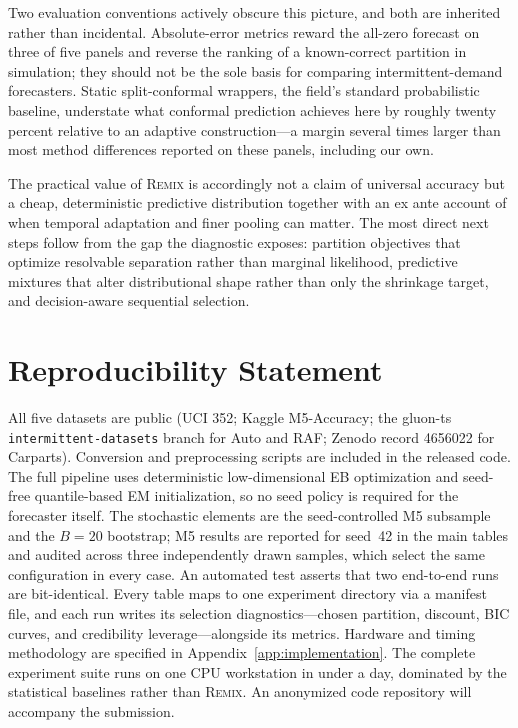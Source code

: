 \documentclass[twocolumn,10pt]{article}
\theoremstyle{definition}
\newcommand{\REMIX}{\textsc{Remix}}
\begin{document}
Two evaluation conventions actively obscure this picture, and both are
inherited rather than incidental. Absolute-error metrics reward the
all-zero forecast on three of five panels and reverse the ranking of a
known-correct partition in simulation; they should not be the sole basis
for comparing intermittent-demand forecasters. Static split-conformal
wrappers, the field's standard probabilistic baseline, understate what
conformal prediction achieves here by roughly twenty percent relative to
an adaptive construction---a margin several times larger than most method
differences reported on these panels, including our own.

The practical value of \REMIX{} is accordingly not a claim of universal
accuracy but a cheap, deterministic predictive distribution together with
an ex ante account of when temporal adaptation and finer pooling can
matter. The most direct next steps follow from the gap the diagnostic
exposes: partition objectives that optimize resolvable separation rather
than marginal likelihood, predictive mixtures that alter distributional
shape rather than only the shrinkage target, and decision-aware sequential
selection.

\section*{Reproducibility Statement}
All five datasets are public (UCI 352; Kaggle M5-Accuracy; the gluon-ts
\texttt{intermittent-datasets} branch for Auto and RAF; Zenodo record
4656022 for Carparts). Conversion and preprocessing scripts are included
in the released code. The full pipeline uses deterministic low-dimensional
EB optimization and seed-free quantile-based EM initialization, so no seed
policy is required for the forecaster itself. The stochastic elements are
the seed-controlled M5 subsample and the $B{=}20$ bootstrap; M5 results
are reported for seed~42 in the main tables and audited across three
independently drawn samples, which select the same configuration in every
case. An automated test asserts that two end-to-end runs are
bit-identical. Every table maps to one experiment directory via a manifest
file, and each run writes its selection diagnostics---chosen partition,
discount, BIC curves, and credibility leverage---alongside its metrics. Hardware and
timing methodology are specified in Appendix~\ref{app:implementation}.
The complete experiment suite runs on one CPU workstation in under a
day, dominated by the statistical baselines rather than \REMIX{}. An
anonymized code repository will accompany the submission.
\end{document}
